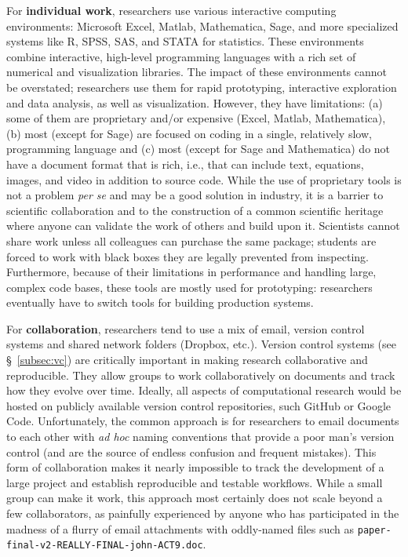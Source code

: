 \documentclass[ChapterTOCs,krantz2]{krantz} %
\begin{document}
For \textbf{individual work}, researchers use various interactive computing
environments: Microsoft Excel, Matlab, Mathematica, Sage, and more specialized
systems like R, SPSS, SAS, and STATA for statistics. These environments combine
interactive, high-level programming languages with a rich set of numerical and
visualization libraries. The impact of these environments cannot be overstated;
researchers use them for rapid prototyping, interactive exploration and data
analysis, as well as visualization. However, they have limitations: (a) some of
them are proprietary and/or expensive (Excel, Matlab, Mathematica), (b) most
(except for Sage) are focused on coding in a single, relatively slow,
programming language and (c) most (except for Sage and Mathematica) do not have
a document format that is rich, i.e., that can include text, equations, images,
and video in addition to source code. While the use of proprietary tools is not
a problem \emph{per se} and may be a good solution in industry, it is a barrier
to scientific collaboration and to the construction of a common scientific
heritage where anyone can validate the work of others and build upon it.
Scientists cannot share work unless all colleagues can purchase the same
package; students are forced to work with black boxes they are legally
prevented from inspecting. Furthermore, because of their limitations in
performance and handling large, complex code bases, these tools are mostly used
for prototyping: researchers eventually have to switch tools for building
production systems.

For \textbf{collaboration}, researchers tend to use a mix of email, version
control systems and shared network folders (Dropbox, etc.).  Version control
systems (see §~\ref{subsec:vc}) are critically important in making research
collaborative and reproducible. They allow groups to work collaboratively on
documents and track how they evolve over time. Ideally, all aspects of
computational research would be hosted on publicly available version control
repositories, such GitHub or Google Code. Unfortunately, the common
approach is for researchers to email documents to each other with
\emph{ad hoc} naming conventions that provide a poor man's version
control (and are the source of endless confusion and frequent mistakes). This
form of collaboration makes it nearly impossible to track the development of a
large project and establish reproducible and testable workflows.  While a
small group can make it work, this approach most certainly
does not scale beyond a few collaborators, as painfully experienced by anyone
who has participated in the madness of a flurry of email attachments with
oddly-named files such as {\tt paper-final-v2-REALLY-FINAL-john-ACT9.doc}.
\end{document}

